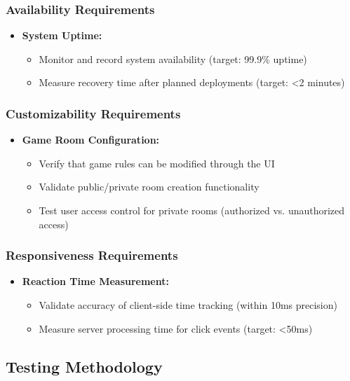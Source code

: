 \documentclass[]{VUMIFTemplateClass}
\begin{document}
\subsubsection{Availability Requirements} 
\begin{itemize} 
    \item \textbf{System Uptime:} 
    \begin{itemize} 
        \item Monitor and record system availability (target: 99.9\% uptime) 
        \item Measure recovery time after planned deployments (target: <2 minutes) 
    \end{itemize}
\end{itemize}

\subsubsection{Customizability Requirements} \begin{itemize} \item \textbf{Game Room Configuration:} \begin{itemize} \item Verify that game rules can be modified through the UI \item Validate public/private room creation functionality \item Test user access control for private rooms (authorized vs. unauthorized access) \end{itemize}

\end{itemize}

\subsubsection{Responsiveness Requirements} \begin{itemize} \item \textbf{Reaction Time Measurement:} \begin{itemize} \item Validate accuracy of client-side time tracking (within 10ms precision) \item Measure server processing time for click events (target: <50ms) \end{itemize}

\end{itemize}

\subsection{Testing Methodology}
\end{document}
